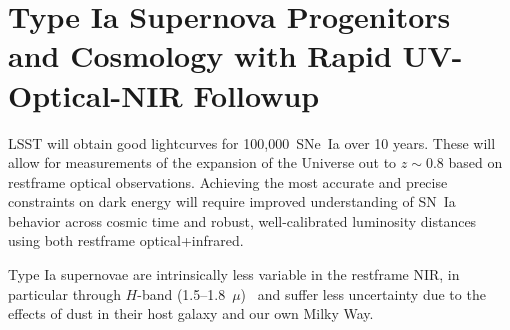 \documentclass[12pt,preprint]{aastex}
\newcommand{\snia}{SN~Ia\xspace}
\newcommand{\sneia}{SNe~Ia\xspace}
\begin{document}
\iffalse
\subsection{Need for Additional Data}

We need to be able to generate full time-dependent SEDs across at least two parameters of variation (e.g., stretch and color) from restframe 0.3--2.5~$\mu$m.  If we wanted to fully follow the direction that SNEMO has taken with the SNFactory data, one could imagine wanted to sample across the 7-parameter or even 15-parameter spaces defined by the SNEMO eigenvectors.  However, brief arithmetic will reveal the infeasibility of this plan.  Even just a 10-point sampling of each dimesion would require observations of $10^{15}$ \sneia.  At an estimated rate of $3.5\times10^{-5}$~\snia/Mpc$^{3}$, there are only $\sim100,000$ \sneia at $z<0.1$ in a 10-year period.

The Plan
\begin{enumerate}
    \item Gather ground-based $z<0.02$ full SEDs of \sneia.  E.g., the very closest observation of SN~2011fe and SN~2014J provided a very rich dataset.  But we likely need 100 of these.
    \item Gather ground-based $0.02<z<0.1$ full SEDs of \sneia.  These will be lower S/N for the same telescope resources, but these redshifts will provide perfect sweet spot of being able to estimate distances {\em better} than we can for $z<0.02$ \sneia where peculiar velocities contribute so much.
\end{enumerate}
\fi

\section{Type Ia Supernova Progenitors and Cosmology with Rapid UV-Optical-NIR Followup}

LSST will obtain good lightcurves for 100,000~\sneia over 10 years.  These will allow for measurements of the expansion of the Universe out to $z\sim0.8$ based on restframe optical observations.  Achieving the most accurate and precise constraints on dark energy will require improved understanding of SN~Ia behavior across cosmic time and robust, well-calibrated luminosity distances using both restframe optical+infrared.

Type Ia supernovae are intrinsically less variable in the restframe NIR, in particular through $H$-band (1.5--1.8~$\mu$)~\citep{Krisciunas04a, Krisciunas04b, Krisciunas04c, Wood-Vasey08, Contreras10, Stritzinger11, Kattner12} and suffer less uncertainty due to the effects of dust in their host galaxy and our own Milky Way.
\end{document}
